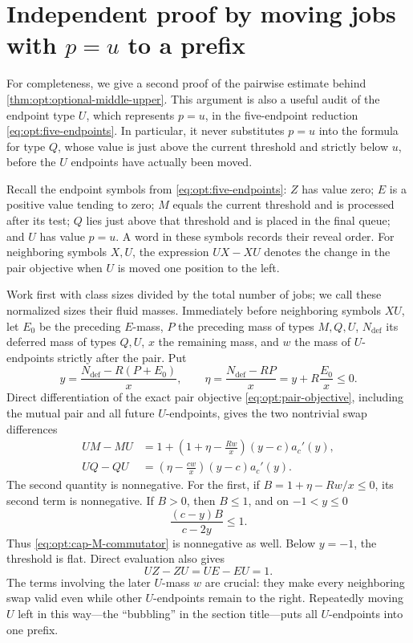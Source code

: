 \section{Independent proof by moving jobs with \texorpdfstring{$p=u$}{p = u} to a prefix}
\label{app:cap-bubbling}
For completeness, we give a second proof of the pairwise estimate behind
\cref{thm:opt:optional-middle-upper}.  This
argument is also a useful audit of the endpoint type $U$, which represents
$p=u$, in the five-endpoint reduction \cref{eq:opt:five-endpoints}.  In
particular, it never substitutes $p=u$ into the formula for type $Q$, whose
value is just above the current threshold and strictly below $u$, before the
$U$ endpoints have actually been moved.

Recall the endpoint symbols from \cref{eq:opt:five-endpoints}: $Z$ has value
zero; $E$ is a positive value tending to zero; $M$ equals the current
threshold and is processed after its test; $Q$ lies just above that threshold
and is placed in the final queue; and $U$ has value $p=u$.  A word in these
symbols records their reveal order.
For neighboring symbols $X,U$, the expression $UX-XU$ denotes the change in
the pair objective when $U$ is moved one position to the left.

Work first with class sizes divided by the total number of jobs; we call
these normalized sizes their fluid masses.  Immediately before neighboring
symbols
$XU$, let $E_0$ be the preceding $E$-mass, $P$ the preceding mass of types
$M,Q,U$, $N_{\mathrm{def}}$ its deferred mass of types $Q,U$, $x$ the
remaining mass, and $w$ the mass of $U$-endpoints strictly after the pair.
Put
\begin{equation}
 y=\frac{N_{\mathrm{def}}-R(P+E_0)}x,
 \qquad
 \eta=\frac{N_{\mathrm{def}}-RP}{x}=y+R\frac{E_0}{x}\le0.
 \label{eq:opt:bubble-state}
\end{equation}
Direct differentiation of the exact pair objective
\eqref{eq:opt:pair-objective}, including the mutual pair and all future
$U$-endpoints, gives the two nontrivial swap differences
\begin{align}
 UM-MU
 &=1+\left(1+\eta-\frac{Rw}{x}\right)
       (y-c)a_c'(y),
 \label{eq:opt:cap-M-commutator}\\
 UQ-QU
 &=\left(\eta-\frac{cw}{x}\right)
       (y-c)a_c'(y).
 \label{eq:opt:cap-Q-commutator}
\end{align}
The second quantity is nonnegative.  For the first, if
$B=1+\eta-Rw/x\le0$, its second term is nonnegative.  If $B>0$, then
$B\le1$, and on $-1<y\le0$
\[
 \frac{(c-y)B}{c-2y}\le1.
\]
Thus \eqref{eq:opt:cap-M-commutator} is nonnegative as well.  Below
$y=-1$, the threshold is flat.  Direct evaluation also gives
\begin{equation}
 UZ-ZU=UE-EU=1.
 \label{eq:opt:cap-zero-commutators}
\end{equation}
The terms involving the later $U$-mass $w$ are crucial: they make every
neighboring swap valid even while other $U$-endpoints remain to the right.
Repeatedly moving $U$ left in this way---the ``bubbling'' in the section
title---puts all $U$-endpoints into one prefix.


